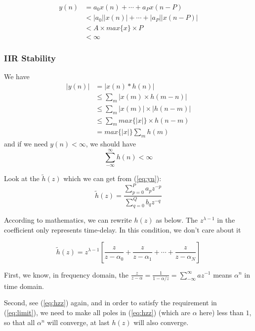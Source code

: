 \documentclass{article}
\begin{document}
\begin{align*}
y(n)  &= a_0x(n) + \cdots + a_Px(n - P) \\ 
&< |a_0||x(n)| + \cdots + |a_P||x(n - P)| \\ 
&< A\times max\{ x \} \times P \\ 
&< \infty
\end{align*}

\subsubsection{IIR Stability}
We have
\begin{align*}
	|y(n)| &= |x(n) * h(n)| \\ 
	& \leq \sum_{m} |x(m) \times h(m - n)| \\ 
	& \leq \sum_{m} |x(m)| \times |h(n - m)| \\ 
	& \leq \sum_{m} max\{ |x| \} \times h(n - m) \\ 
	& = max\{ |x| \}  \sum_{m} h(m)
\end{align*}
and if we need $y(n) < \infty$, we should have
\begin{equation}
\sum_{- \infty}^{\infty} h(n) < \infty
\label{eq:limit}
\end{equation}

Look at the $\tilde{h}(z)$ which we can get from (\ref{eq:yn}):
\begin{equation}
	\tilde{h}(z) = \frac{\sum_{p = 0}^{P}a_p z^{-p}}{\sum_{q = 0}^{Q} b_q z^{-q}}
	\label{eq:hz}
\end{equation}

According to mathematics, we can rewrite $h(z)$ as below. The $z^{\lambda-1}$ in the coefficient only represents time-delay. In this condition, we don't care about it

\begin{equation}
\tilde{h}(z) = z^{\lambda - 1} \left[ \frac{z}{z - \alpha_0} + \frac{z}{z - \alpha_1 } + \cdots + \frac{z}{z - \alpha_N } \right]
\label{eq:hzz}
\end{equation}

First, we know, in frequency domain, the $\frac{z}{z - \alpha} = \frac{1}{1 - \alpha/z} = \sum_{- \infty}^{\infty} az^{-1}$ means $\alpha^n$ in time domain.

Second, see (\ref{eq:hzz}) again, and in order to satisfy the requirement in (\ref{eq:limit}), we need to make all poles in (\ref{eq:hzz}) (which are $\alpha$ here) less than $1$, so that all $\alpha^n$ will converge, at last $h(z)$ will also converge.
\end{document}
